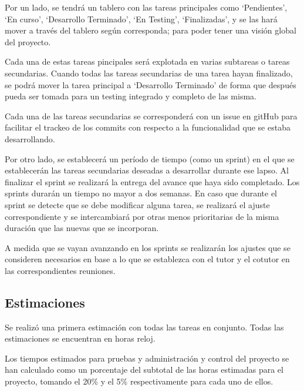 \documentclass[a4paper]{article}
\begin{document}
Por un lado, se tendrá un tablero con las tareas principales como `Pendientes', `En curso', `Desarrollo Terminado', `En Testing', `Finalizadas', y se las hará mover a través del tablero según corresponda; para poder tener una visión global del proyecto.

Cada una de estas tareas pincipales será explotada en varias subtareas o tareas secundarias. Cuando todas las tareas secundarias de una tarea hayan finalizado, se podrá mover la tarea principal a `Desarrollo Terminado' de forma que después pueda ser tomada para un testing integrado y completo de las misma.

Cada una de las tareas secundarias se corresponderá con un issue en gitHub para facilitar el trackeo de los commits con respecto a la funcionalidad que se estaba desarrollando.

Por otro lado, se establecerá un período de tiempo (como un sprint) en el que se establecerán las tareas secundarias deseadas a desarrollar durante ese lapso. Al finalizar el sprint se realizará la entrega del avance que haya sido completado. Los sprints durarán un tiempo no mayor a dos semanas. En caso que durante el sprint se detecte que se debe modificar alguna tarea, se realizará el ajuste correspondiente y se intercambiará por otras menos prioritarias de la misma duración que las nuevas que se incorporan.

A medida que se vayan avanzando en los sprints se realizarán los ajustes que se consideren necesarios en base a lo que se establezca con el tutor y el cotutor en las correspondientes reuniones.

\subsection{Estimaciones}

Se realizó una primera estimación con todas las tareas en conjunto. Todas las estimaciones se encuentran en horas reloj.

Los tiempos estimados para pruebas y administración y control del proyecto se han calculado como un porcentaje del subtotal de las horas estimadas para el proyecto, tomando el 20\% y el 5\% respectivamente para cada uno de ellos.
\end{document}
